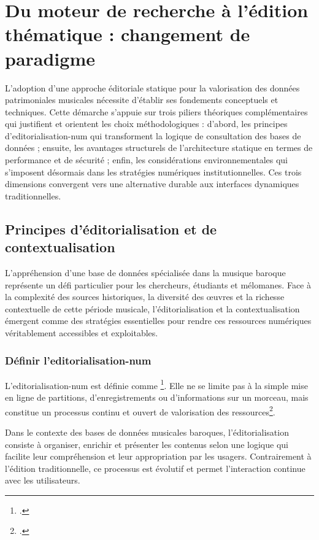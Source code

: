 \section[Du moteur de recherche à l'édition thématique]{Du moteur de recherche à l'édition thématique : changement de paradigme}

L'adoption d'une approche éditoriale statique pour la valorisation des données patrimoniales musicales nécessite d'établir ses fondements conceptuels et techniques. Cette démarche s'appuie sur trois piliers théoriques complémentaires qui justifient et orientent les choix méthodologiques : d'abord, les principes d'\gls{editorialisation-num} qui transforment la logique de consultation des bases de données ; ensuite, les avantages structurels de l'architecture statique en termes de performance et de sécurité ; enfin, les considérations environnementales qui s'imposent désormais dans les stratégies numériques institutionnelles. Ces trois dimensions convergent vers une alternative durable aux interfaces dynamiques traditionnelles.

\subsection{Principes d'éditorialisation et de contextualisation}

L'appréhension d'une base de données spécialisée dans la musique baroque représente un défi particulier pour les chercheurs, étudiants et mélomanes. Face à la complexité des sources historiques, la diversité des œuvres et la richesse contextuelle de cette période musicale, l'éditorialisation et la contextualisation émergent comme des stratégies essentielles pour rendre ces ressources numériques véritablement accessibles et exploitables.

\subsubsection{Définir l'\gls{editorialisation-num}}

L'\gls{editorialisation-num} est définie comme \footcite{sinatraIntroduction2014}. Elle ne se limite pas à la simple mise en ligne de partitions, d'enregistrements ou d’informations sur un morceau, mais constitue un processus continu et ouvert de valorisation des ressources\footcite{mdupondVitaliRosatiMarcello20162020}.

Dans le contexte des bases de données musicales baroques, l'éditorialisation consiste à organiser, enrichir et présenter les contenus selon une logique qui facilite leur compréhension et leur appropriation par les usagers. Contrairement à l'édition traditionnelle, ce processus est évolutif et permet l'interaction continue avec les utilisateurs.

